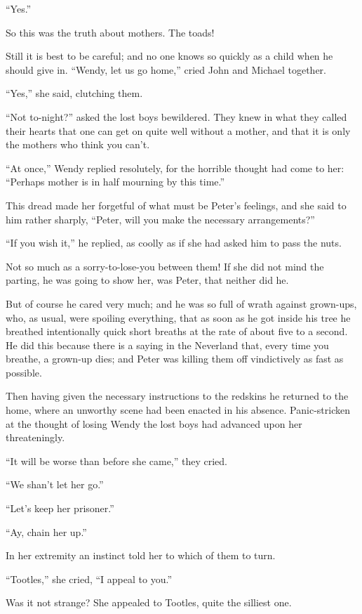 ``Yes.''

So this was the truth about mothers. The toads!

Still it is best to be careful; and no one knows so quickly as a child
when he should give in. ``Wendy, let us go home,'' cried John and Michael
together.

``Yes,'' she said, clutching them.

``Not to-night?'' asked the lost boys bewildered. They knew in what they
called their hearts that one can get on quite well without a mother,
and that it is only the mothers who think you can't.

``At once,'' Wendy replied resolutely, for the horrible thought had come
to her: ``Perhaps mother is in half mourning by this time.''

This dread made her forgetful of what must be Peter's feelings, and she
said to him rather sharply, ``Peter, will you make the necessary
arrangements?''

``If you wish it,'' he replied, as coolly as if she had asked him to pass
the nuts.

Not so much as a sorry-to-lose-you between them! If she did not mind
the parting, he was going to show her, was Peter, that neither did he.

But of course he cared very much; and he was so full of wrath against
grown-ups, who, as usual, were spoiling everything, that as soon as he
got inside his tree he breathed intentionally quick short breaths at
the rate of about five to a second. He did this because there is a
saying in the Neverland that, every time you breathe, a grown-up dies;
and Peter was killing them off vindictively as fast as possible.

Then having given the necessary instructions to the redskins he
returned to the home, where an unworthy scene had been enacted in his
absence. Panic-stricken at the thought of losing Wendy the lost boys
had advanced upon her threateningly.

``It will be worse than before she came,'' they cried.

``We shan't let her go.''

``Let's keep her prisoner.''

``Ay, chain her up.''

In her extremity an instinct told her to which of them to turn.

``Tootles,'' she cried, ``I appeal to you.''

Was it not strange? She appealed to Tootles, quite the silliest one.

